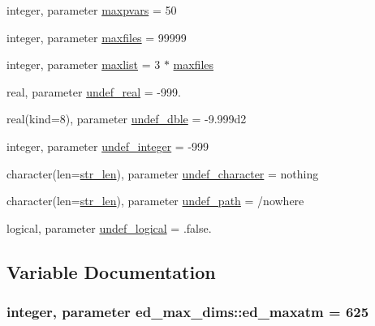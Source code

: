 \begin{DoxyCompactItemize}
\item 
integer, parameter \hyperlink{namespaceed__max__dims_a8a123eff9f71a8d57c2b6d7cec1d3c5b}{maxpvars} = 50
\item 
integer, parameter \hyperlink{namespaceed__max__dims_a45e43025f8cc741156429739b0501e1e}{maxfiles} = 99999
\item 
integer, parameter \hyperlink{namespaceed__max__dims_a044088d546c2e93b93de0b814f696be7}{maxlist} = 3 $\ast$ \hyperlink{namespaceed__max__dims_a45e43025f8cc741156429739b0501e1e}{maxfiles}
\item 
real, parameter \hyperlink{namespaceed__max__dims_aef3aefdf7aea5b758051bfc525dc719d}{undef\+\_\+real} = -\/999.
\item 
real(kind=8), parameter \hyperlink{namespaceed__max__dims_afb7d078e8eb6e8094ff979414b2500cf}{undef\+\_\+dble} = -\/9.\+999d2
\item 
integer, parameter \hyperlink{namespaceed__max__dims_a5cb1206cd6171b2aac2b47b056fcde4b}{undef\+\_\+integer} = -\/999
\item 
character(len=\hyperlink{namespaceed__max__dims_a2d9d6df2bb657ed6455ccdf411863dd9}{str\+\_\+len}), parameter \hyperlink{namespaceed__max__dims_ae43730f1b622bf8a25fe78b4e8a8dd8f}{undef\+\_\+character} = \textquotesingle{}nothing\textquotesingle{}
\item 
character(len=\hyperlink{namespaceed__max__dims_a2d9d6df2bb657ed6455ccdf411863dd9}{str\+\_\+len}), parameter \hyperlink{namespaceed__max__dims_ab42483146ea3e3c0eba8d1de6e746691}{undef\+\_\+path} = \textquotesingle{}/nowhere\textquotesingle{}
\item 
logical, parameter \hyperlink{namespaceed__max__dims_afc1309671c882a76723979195b5fc607}{undef\+\_\+logical} = .false.
\end{DoxyCompactItemize}


\subsection{Variable Documentation}
\subsubsection[{\texorpdfstring{ed\+\_\+maxatm}{ed_maxatm}}]{\setlength{\rightskip}{0pt plus 5cm}integer, parameter ed\+\_\+max\+\_\+dims\+::ed\+\_\+maxatm = 625}\hypertarget{namespaceed__max__dims_a9546595c14761003135ceaea096141e0}{}\label{namespaceed__max__dims_a9546595c14761003135ceaea096141e0}
